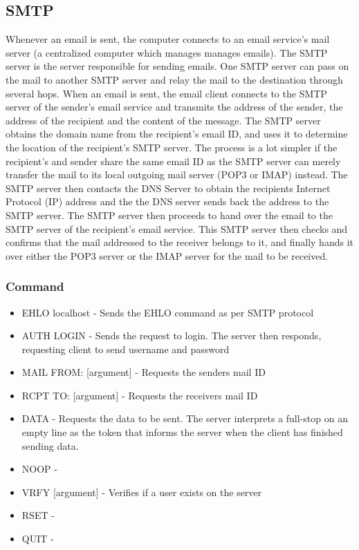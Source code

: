 \documentclass[11pt]{article}
\begin{document}
\begin{multicols}{2}
\subsection{SMTP}
Whenever an email is sent, the computer connects to an email service’s mail server (a centralized computer which manages manages emails). The SMTP server is the server responsible for sending emails. One SMTP server can pass on the mail to another SMTP server and relay the mail to the destination through several hops. When an email is sent, the email client connects to the SMTP server of the sender’s email service and transmits the address of the sender, the address of the recipient and the content of the message. The SMTP server obtains the domain name from the recipient’s email ID, and uses it to determine the location of the recipient's SMTP server. The process is a lot simpler if the recipient’s and sender share the same email ID as the SMTP server can merely transfer the mail to its local outgoing mail server (POP3 or IMAP) instead. The SMTP server then contacts the DNS Server to obtain the recipients Internet Protocol (IP) address and the the DNS server sends back the address to the SMTP server. The SMTP server then proceeds to hand over the email to the SMTP server of the recipient’s email service. This SMTP server then checks and confirms that the mail addressed to the receiver belongs to it, and finally hands it over either the POP3 server or the IMAP server for the mail to be received.
\subsubsection{Command}
\begin{itemize}
  \item EHLO localhost - Sends the EHLO command as per SMTP protocol
  \item AUTH LOGIN - Sends the request to login. The server then responds, requesting client to send username and password
  \item MAIL FROM: [argument] - Requests the senders mail ID
  \item RCPT TO: [argument] - Requests the receivers mail ID
  \item DATA - Requests the data to be sent. The server interprets a full-stop on an empty line as the token that informs the server when the client has finished sending data.
  \item NOOP - 
  \item VRFY [argument] - Verifies if a user exists on the server
  \item RSET - 
  \item QUIT - 
\end{itemize}

\end{multicols}
\end{document}
